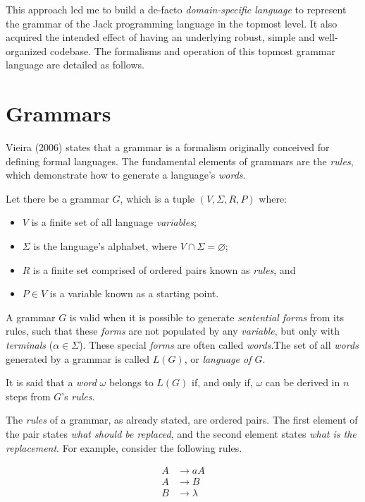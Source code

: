 \documentclass[a4paper,11pt,oneside]{article}
\begin{document}
This approach led me to build a de-facto \emph{domain-specific language}
to represent the grammar of the Jack programming language in the
topmost level. It also acquired the intended effect of having an
underlying robust, simple and well-organized codebase. The formalisms
and operation of this topmost grammar language are detailed as follows.

\section{Grammars}
\label{sec:org026c2cb}

Vieira (2006)\cite{newton2006} states that a grammar is a formalism
originally conceived for defining formal languages. The fundamental
elements of grammars are the \emph{rules}, which demonstrate how to generate
a language's \emph{words}.

Let there be a grammar \(G\), which is a tuple \((V, \Sigma, R, P)\)
where:

\begin{itemize}
\item \(V\) is a finite set of all language \emph{variables};
\item \(\Sigma\) is the language's alphabet, where \(V \cap \Sigma =
  \varnothing\);
\item \(R\) is a finite set comprised of ordered pairs known as \emph{rules}, and
\item \(P \in V\) is a variable known as a starting point.
\end{itemize}

A grammar \(G\) is valid when it is possible to generate \emph{sentential
forms} from its rules, such that these \emph{forms} are not populated by any
\emph{variable}, but only with \emph{terminals} (\(\alpha \in \Sigma\)). These special
\emph{forms} are often called \emph{words}.The set of all \emph{words} generated by a
grammar is called \(L(G)\), or \emph{language of \(G\)}.

It is said that a \emph{word} \(\omega\) belongs to \(L(G)\) if, and only if,
\(\omega\) can be derived in \(n\) steps from \(G\)'s \emph{rules}.

The \emph{rules} of a grammar, as already stated, are ordered pairs. The
first element of the pair states \emph{what should be replaced}, and the
second element states \emph{what is the replacement}. For example, consider
the following rules.

\begin{align}
A &\rightarrow aA\\
A &\rightarrow B\\
B &\rightarrow \lambda
\end{align}
\end{document}
